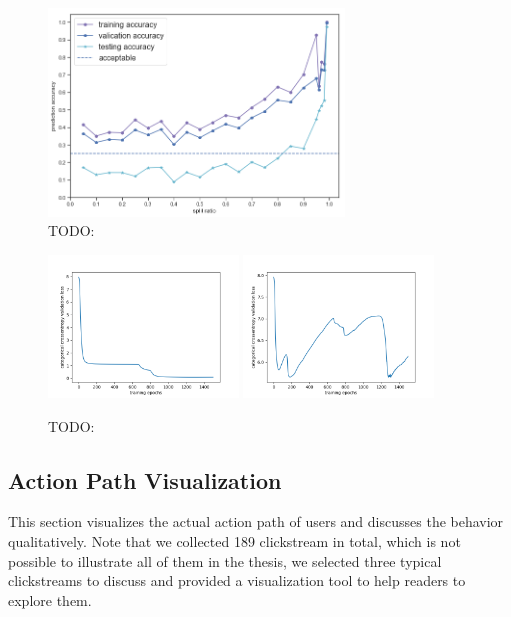 \begin{figure}[H]
    \centering
    \includegraphics[width=0.7\textwidth]{figures/acc}
    \caption{TODO:}
    \label{fig:acc}
\end{figure}

\begin{figure}[H]
    \centering
    \includegraphics[width=0.45\textwidth]{figures/loss1}
    \includegraphics[width=0.45\textwidth]{figures/loss2}
    \caption{TODO:}
    \label{fig:loss}
\end{figure}


\subsection{Action Path Visualization}

This section visualizes the actual action path of users and discusses the behavior qualitatively.
Note that we collected 189 clickstream in total, which is not possible to illustrate all of them
in the thesis, we selected three typical clickstreams to discuss and provided a visualization tool
to help readers to explore them.


